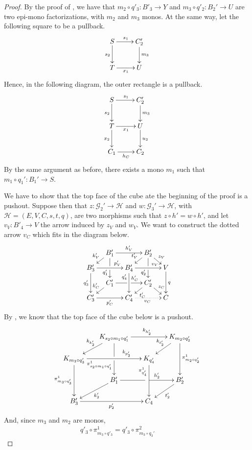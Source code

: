 \begin{proof}
	By the proof of , we have that $m_2 \circ q'_3 : B'_3 \to Y$ and $m_3 \circ q'_2 : B_2' \to U$ are two epi-mono factorizations, with $m_2$ and $m_3$ monos.
	At the same way, let the following square to be a pullback.
	\[\xymatrix{S\ar[r]^{s_1}\ar[d]_{s_2}&C'_2\ar[d]^{m_3}\\T\ar[r]_{x_1}&U}\]
	Hence, in the following diagram, the outer rectangle is a pullback.
	\[\xymatrix{
			S\ar[r]^{s_1}\ar[d]_{s_2}&C'_2\ar[d]^{m_3}\\T\ar[r]_{x_1}\ar[d]_{x_2}&U\ar[d]^{u_2}\\C_1\ar[r]_{h_C}&C_2
	}\]
	By the same argument as before, there exists a mono $m_1$ such that $m_1\circ q_1' : B_1' \to S$.

	We have to show that the top face of the cube ate the beginning of the proof is a pushout.
	Suppose then that $z: \mathcal{G}_2' \to \mathcal{H}$ and $w: \mathcal{G}_3' \to \mathcal{H}$, with $\mathcal{H} = (E, V, C, s, t, q)$,
	are two morphisms such that $z \circ h' = w \circ h'$, and let $v_V: B'_4 \to V$ the arrow induced by $z_V$ and $w_V$.
	We want to construct the dotted arrow $v_C$ which fits in the diagram below.
	\[
	\xymatrix@C=10pt@R=6pt{
		&B_1'\ar[dd]|\hole_(.65){q_1'}\ar[rr]^{h_V'} \ar[dl]_{k_V'} && B_2' \ar[dd]|\hole_(.65){q_2'} \ar[dl]_{t_V'}\ar[dr]^{z_V}\\
		B_3'  \ar[dd]_{q_3'}\ar[rr]^(.7){p_V'} & & B_4' \ar[dd]_(.3){q_4'} \ar[rr]^(.7){v_V}&&  V\ar[dd]^{q}\\
						       &C_1'\ar[rr]|\hole^(.65){h_C'} \ar[dl]_{k_C'} && C_2' \ar[dl]^{t_C'}\ar[dr]^{z_C}\\
		C'_3 \ar[rr]_{p_C'} & & C'_4\ar@{.>}[rr]_{v_C} && C
	}\]
	By , we know that the top face of the cube below is a pushout.
\[\xymatrix@C=15pt@R=15pt{&K_{s_2\circ m_1\circ q'_1}\ar[dd]|\hole_(.65){\pi_{s_2\circ m_1\circ q'_1}^{1}}\ar[rr]^{k_{h'_2}} \ar[dl]_{k_{k'_2}} && K_{m_2\circ q'_2} \ar[dd]^{\pi_{m_2\circ q'_2}^{1}} \ar[dl]_{k_{t'_2}} \\ K_{m_3\circ q'_3}  \ar[dd]_{\pi_{m_3\circ q'_3}^{1}}\ar[rr]^(.7){k_{p'_2}} & & K_{q'_4} \ar[dd]_(.3){\pi_{q'_4}^{1}}\\&B'_1\ar[rr]|\hole^(.65){h'_2} \ar[dl]^{k'_2} && B'_2 \ar[dl]^{t'_2} \\B'_3 \ar[rr]_{p'_2} & & C_4}\]
	And, since $m_3$ and $m_2$ are monos,
	\[\begin{split}
		q'_3 \circ \pi_{m_3 \circ q'_3}^1 = q'_3 \circ \pi_{m_3\circ q_3'}^2
	\end{split}\qquad\begin{split}

\end{split}\]
\end{proof}
